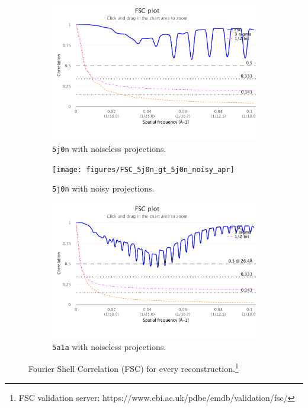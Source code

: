 \begin{figure}[ht!]
    \centering
    \begin{subfigure}[t]{0.3\linewidth}
        \includegraphics[width=\linewidth]{figures/FSC_5j0n_gt_5j0n_apr.pdf}
        \caption{%
            \texttt{5j0n} with noiseless projections.
    }\label{fig:results:fsc-5j0n-noise0}
    \end{subfigure}
    \hfill
    \begin{subfigure}[t]{0.3\linewidth}
        \texttt{[image: figures/FSC\_5j0n\_gt\_5j0n\_noisy\_apr]}
        \caption{%
        \texttt{5j0n} with noisy projections.
        }\label{fig:results:fsc-5j0n-noise16}
    \end{subfigure}
    \hfill
    \begin{subfigure}[t]{0.3\linewidth}
        \includegraphics[width=\linewidth]{figures/FSC_5a1a_gt_5a1a_apr.pdf}
        \caption{%
        \texttt{5a1a} with noiseless projections.
        }\label{fig:results:fsc-5a1a-noise0}
    \end{subfigure}
    \caption{%
     Fourier Shell Correlation (FSC) for every reconstruction.\footnote{FSC validation server: https://www.ebi.ac.uk/pdbe/emdb/validation/fsc/}
    }
\end{figure}

